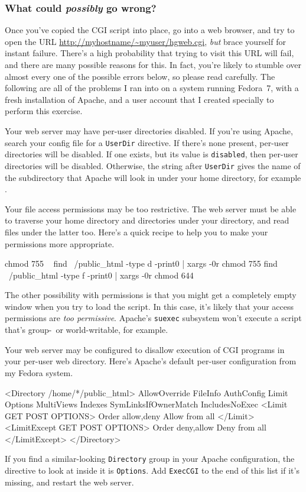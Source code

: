 \subsubsection{What could \emph{possibly} go wrong?}
\label{sec:collab:wtf}

Once you've copied the CGI script into place, go into a web browser,
and try to open the URL \url{http://myhostname/~myuser/hgweb.cgi},
\emph{but} brace yourself for instant failure.  There's a high
probability that trying to visit this URL will fail, and there are
many possible reasons for this.  In fact, you're likely to stumble
over almost every one of the possible errors below, so please read
carefully.  The following are all of the problems I ran into on a
system running Fedora~7, with a fresh installation of Apache, and a
user account that I created specially to perform this exercise.

Your web server may have per-user directories disabled.  If you're
using Apache, search your config file for a \texttt{UserDir}
directive.  If there's none present, per-user directories will be
disabled.  If one exists, but its value is \texttt{disabled}, then
per-user directories will be disabled.  Otherwise, the string after
\texttt{UserDir} gives the name of the subdirectory that Apache will
look in under your home directory, for example .

Your file access permissions may be too restrictive.  The web server
must be able to traverse your home directory and directories under
your  directory, and read files under the latter
too.  Here's a quick recipe to help you to make your permissions more
appropriate.
\begin{codesample2}
  chmod 755 ~
  find ~/public_html -type d -print0 | xargs -0r chmod 755
  find ~/public_html -type f -print0 | xargs -0r chmod 644
\end{codesample2}

The other possibility with permissions is that you might get a
completely empty window when you try to load the script.  In this
case, it's likely that your access permissions are \emph{too
  permissive}.  Apache's \texttt{suexec} subsystem won't execute a
script that's group-~or world-writable, for example.

Your web server may be configured to disallow execution of CGI
programs in your per-user web directory.  Here's Apache's
default per-user configuration from my Fedora system.
\begin{codesample2}
  <Directory /home/*/public_html>
      AllowOverride FileInfo AuthConfig Limit
      Options MultiViews Indexes SymLinksIfOwnerMatch IncludesNoExec
      <Limit GET POST OPTIONS>
          Order allow,deny
          Allow from all
      </Limit>
      <LimitExcept GET POST OPTIONS>
          Order deny,allow
          Deny from all
      </LimitExcept>
  </Directory>
\end{codesample2}
If you find a similar-looking \texttt{Directory} group in your Apache
configuration, the directive to look at inside it is \texttt{Options}.
Add \texttt{ExecCGI} to the end of this list if it's missing, and
restart the web server.

